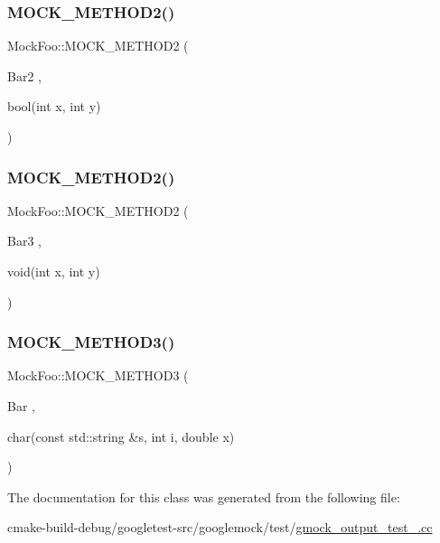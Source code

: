 \subsubsection{\texorpdfstring{MOCK\_METHOD2()}{MOCK\_METHOD2()}\hspace{0.1cm}{\footnotesize\ttfamily [1/2]}}
{\footnotesize\ttfamily Mock\+Foo\+::\+M\+O\+C\+K\+\_\+\+M\+E\+T\+H\+O\+D2 (\begin{DoxyParamCaption}\item[{Bar2}]{,  }\item[{bool(int x, int y)}]{ }\end{DoxyParamCaption})}

\mbox{\label{classMockFoo_af1e0c374cadacdaa7ca69f9c38d85543}} 
\subsubsection{\texorpdfstring{MOCK\_METHOD2()}{MOCK\_METHOD2()}\hspace{0.1cm}{\footnotesize\ttfamily [2/2]}}
{\footnotesize\ttfamily Mock\+Foo\+::\+M\+O\+C\+K\+\_\+\+M\+E\+T\+H\+O\+D2 (\begin{DoxyParamCaption}\item[{Bar3}]{,  }\item[{void(int x, int y)}]{ }\end{DoxyParamCaption})}

\mbox{\label{classMockFoo_a8f323a65afd93c0605a02b278b101d18}} 
\subsubsection{\texorpdfstring{MOCK\_METHOD3()}{MOCK\_METHOD3()}}
{\footnotesize\ttfamily Mock\+Foo\+::\+M\+O\+C\+K\+\_\+\+M\+E\+T\+H\+O\+D3 (\begin{DoxyParamCaption}\item[{Bar}]{,  }\item[{char(const std\+::string \&s, int i, double x)}]{ }\end{DoxyParamCaption})}



The documentation for this class was generated from the following file\+:\begin{DoxyCompactItemize}
\item 
cmake-\/build-\/debug/googletest-\/src/googlemock/test/\mbox{\hyperlink{gmock__output__test___8cc}{gmock\+\_\+output\+\_\+test\+\_\+.\+cc}}\end{DoxyCompactItemize}
